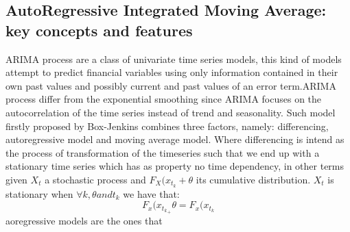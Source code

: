 \documentclass[twocolumn]{article}
\begin{document}
\begin{center}
\end{center}
\label{algoproces}
\subsection{AutoRegressive Integrated Moving Average: key concepts and features}
ARIMA process are a class of univariate time series models, this kind of models attempt to predict financial variables using only information contained in their own past values and possibly current and past values of an error term.ARIMA process differ from the exponential smoothing since ARIMA focuses on the autocorrelation of the time series instead of trend and seasonality. Such model firstly proposed by Box-Jenkins %
combines three factors, namely: differencing, autoregressive model and moving average model.
Where differencing is intend as the process of transformation of the timeseries such that we end up with a stationary time series which has as property no time dependency, in other terms given $X_t$ a stochastic process and $F_X(x_{t_k}+\theta$ its cumulative distribution. $X_t$ is stationary when $\forall k,\theta and t_k$ we have that:
\[ F_x(x_{t_k}_+\theta = F_x(x_{t_k} \]
aoregressive models are the ones that

\printbibliography
\end{document}
